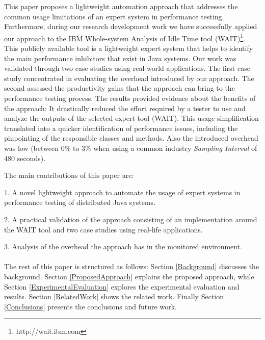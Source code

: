 \documentclass[runningheads,a4paper]{llncs}
\begin{document}
This paper proposes a lightweight automation approach that addresses the common
usage limitations of an expert system in performance testing. Furthermore,
during our research development work we have successfully applied our approach
to the IBM Whole-system Analysis of Idle Time tool (WAIT)\footnote{http://wait.ibm.com}. 
This publicly available tool is a lightweight expert system that helps to
identify the main performance inhibitors that exist in Java systems. Our work was 
validated through two case studies using real-world applications. The first case study 
concentrated in evaluating the overhead introduced by our approach. The second
assessed the productivity gains that the approach can bring to the
performance testing process. The results provided evidence about
the benefits of the approach: It drastically reduced the effort required by a
tester to use and analyze the outputs of the selected expert tool (WAIT). This
usage simplification translated into a quicker identification of performance issues, 
including the pinpointing of the responsible classes and methods. Also the
introduced overhead was low (between 0\% to 3\% when using a common industry
\emph{Sampling Interval} of 480 seconds).

The main contributions of this paper are: 

1. A novel lightweight approach to automate the usage of expert systems in
performance testing of distributed Java systems.

2. A practical validation of the approach consisting of an implementation
around the WAIT tool and two case studies using real-life applications.

3. Analysis of the overhead the approach has in the monitored environment.
\\\\
The rest of this paper is structured as follows: Section \ref{Background}
discusses the background. Section \ref{ProposedApproach} explains the proposed
approach, while Section \ref{ExperimentalEvaluation} explores the experimental 
evaluation and results. Section \ref{RelatedWork} shows the related work.
Finally Section \ref{Conclusions} presents the conclusions and future work.


\vspace{-7pt}
\end{document}
